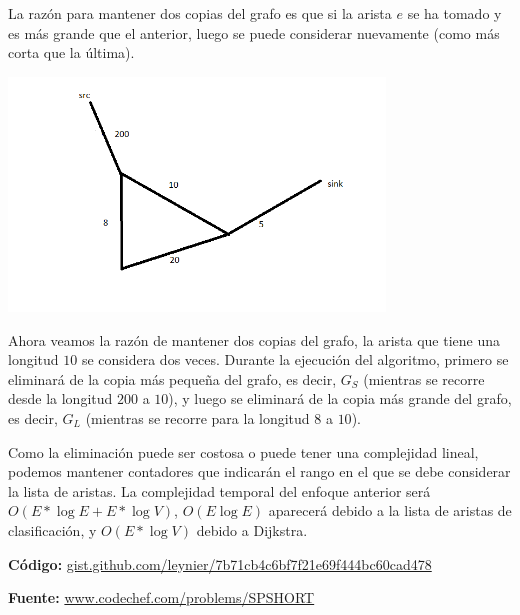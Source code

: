 \documentclass[12pt]{article}
\newcommand{\nl}{\vspace{0.3cm}}
\begin{document}
\nl

La razón para mantener dos copias del grafo es que si la arista $e$ se ha tomado y es más grande que el anterior, luego se puede considerar nuevamente (como más corta que la última).

\begin{center}
	\includegraphics[width=10cm]{images/image1.png}
\end{center}

Ahora veamos la razón de mantener dos copias del grafo, la arista que tiene una longitud $10$ se considera dos veces. Durante la ejecución del algoritmo, primero se eliminará de la copia más pequeña del grafo, es decir, $G_S$ (mientras se recorre desde la longitud $200$ a $10$), y luego se eliminará de la copia más grande del grafo, es decir, $G_L$ (mientras se recorre para la longitud $8$ a $10$).

\nl

Como la eliminación puede ser costosa o puede tener una complejidad lineal, podemos mantener contadores que indicarán el rango en el que se debe considerar la lista de aristas. La complejidad temporal del enfoque anterior será $O(E * \log{E} + E * \log{V})$, $O(E \log{E})$ aparecerá debido a la lista de aristas de clasificación, y $O(E * \log{V})$ debido a Dijkstra.

\nl

\textbf{Código:} \href{https://gist.github.com/leynier/7b71cb4c6bf7f21e69f444bc60cad478}{gist.github.com/leynier/7b71cb4c6bf7f21e69f444bc60cad478}

\nl

\textbf{Fuente:} \href{https://www.codechef.com/problems/SPSHORT}{www.codechef.com/problems/SPSHORT}

\newpage

\nocite{*}


\end{document}
